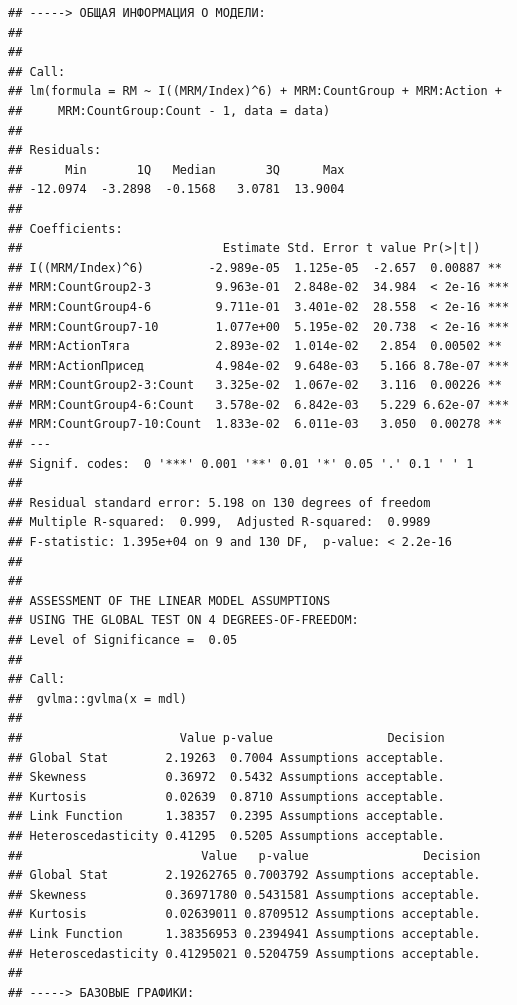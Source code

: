 \documentclass[
]{article}
\begin{document}
\begin{verbatim}
## -----> ОБЩАЯ ИНФОРМАЦИЯ О МОДЕЛИ:
## 
## 
## Call:
## lm(formula = RM ~ I((MRM/Index)^6) + MRM:CountGroup + MRM:Action + 
##     MRM:CountGroup:Count - 1, data = data)
## 
## Residuals:
##      Min       1Q   Median       3Q      Max 
## -12.0974  -3.2898  -0.1568   3.0781  13.9004 
## 
## Coefficients:
##                            Estimate Std. Error t value Pr(>|t|)    
## I((MRM/Index)^6)         -2.989e-05  1.125e-05  -2.657  0.00887 ** 
## MRM:CountGroup2-3         9.963e-01  2.848e-02  34.984  < 2e-16 ***
## MRM:CountGroup4-6         9.711e-01  3.401e-02  28.558  < 2e-16 ***
## MRM:CountGroup7-10        1.077e+00  5.195e-02  20.738  < 2e-16 ***
## MRM:ActionТяга            2.893e-02  1.014e-02   2.854  0.00502 ** 
## MRM:ActionПрисед          4.984e-02  9.648e-03   5.166 8.78e-07 ***
## MRM:CountGroup2-3:Count   3.325e-02  1.067e-02   3.116  0.00226 ** 
## MRM:CountGroup4-6:Count   3.578e-02  6.842e-03   5.229 6.62e-07 ***
## MRM:CountGroup7-10:Count  1.833e-02  6.011e-03   3.050  0.00278 ** 
## ---
## Signif. codes:  0 '***' 0.001 '**' 0.01 '*' 0.05 '.' 0.1 ' ' 1
## 
## Residual standard error: 5.198 on 130 degrees of freedom
## Multiple R-squared:  0.999,  Adjusted R-squared:  0.9989 
## F-statistic: 1.395e+04 on 9 and 130 DF,  p-value: < 2.2e-16
## 
## 
## ASSESSMENT OF THE LINEAR MODEL ASSUMPTIONS
## USING THE GLOBAL TEST ON 4 DEGREES-OF-FREEDOM:
## Level of Significance =  0.05 
## 
## Call:
##  gvlma::gvlma(x = mdl) 
## 
##                      Value p-value                Decision
## Global Stat        2.19263  0.7004 Assumptions acceptable.
## Skewness           0.36972  0.5432 Assumptions acceptable.
## Kurtosis           0.02639  0.8710 Assumptions acceptable.
## Link Function      1.38357  0.2395 Assumptions acceptable.
## Heteroscedasticity 0.41295  0.5205 Assumptions acceptable.
##                         Value   p-value                Decision
## Global Stat        2.19262765 0.7003792 Assumptions acceptable.
## Skewness           0.36971780 0.5431581 Assumptions acceptable.
## Kurtosis           0.02639011 0.8709512 Assumptions acceptable.
## Link Function      1.38356953 0.2394941 Assumptions acceptable.
## Heteroscedasticity 0.41295021 0.5204759 Assumptions acceptable.
## 
## -----> БАЗОВЫЕ ГРАФИКИ:
\end{verbatim}
\end{document}
